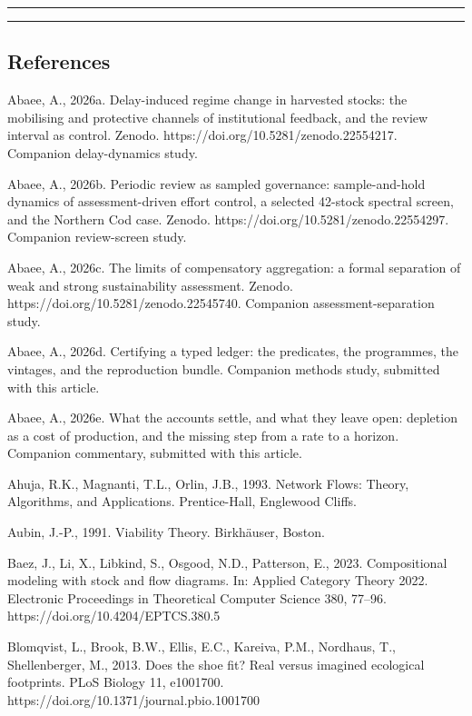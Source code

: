 \documentclass[11pt]{article}
\begin{document}
\begin{center}\rule{0.5\linewidth}{0.5pt}\end{center}

\begin{center}\rule{0.5\linewidth}{0.5pt}\end{center}

\subsection{References}\label{references}

Abaee, A., 2026a. Delay-induced regime change in harvested stocks: the
mobilising and protective channels of institutional feedback, and the
review interval as control. Zenodo.
https://doi.org/10.5281/zenodo.22554217. Companion delay-dynamics study.

Abaee, A., 2026b. Periodic review as sampled governance: sample-and-hold
dynamics of assessment-driven effort control, a selected 42-stock
spectral screen, and the Northern Cod case. Zenodo.
https://doi.org/10.5281/zenodo.22554297. Companion review-screen study.

Abaee, A., 2026c. The limits of compensatory aggregation: a formal separation of weak and strong sustainability assessment. Zenodo. https://doi.org/10.5281/zenodo.22545740. Companion assessment-separation study.

Abaee, A., 2026d. Certifying a typed ledger: the predicates, the programmes, the vintages, and the reproduction bundle. Companion methods study, submitted with this article.

Abaee, A., 2026e. What the accounts settle, and what they leave open: depletion as a cost of production, and the missing step from a rate to a horizon. Companion commentary, submitted with this article.

Ahuja, R.K., Magnanti, T.L., Orlin, J.B., 1993. Network Flows: Theory, Algorithms, and Applications. Prentice-Hall, Englewood Cliffs.

Aubin, J.-P., 1991. Viability Theory. Birkh\"auser, Boston.

Baez, J., Li, X., Libkind, S., Osgood, N.D., Patterson, E., 2023. Compositional modeling with stock and flow diagrams. In: Applied Category Theory 2022. Electronic Proceedings in Theoretical Computer Science 380, 77--96. https://doi.org/10.4204/EPTCS.380.5

Blomqvist, L., Brook, B.W., Ellis, E.C., Kareiva, P.M., Nordhaus, T.,
Shellenberger, M., 2013. Does the shoe fit? Real versus imagined
ecological footprints. PLoS Biology 11, e1001700.
https://doi.org/10.1371/journal.pbio.1001700
\end{document}
